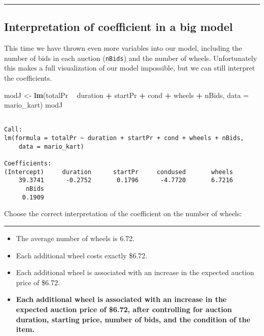 \documentclass[]{book}
\newenvironment{Shaded}{\begin{snugshade}}{\end{snugshade}}
\newcommand{\KeywordTok}[1]{\textcolor[rgb]{0.13,0.29,0.53}{\textbf{#1}}}
\newcommand{\DataTypeTok}[1]{\textcolor[rgb]{0.13,0.29,0.53}{#1}}
\newcommand{\StringTok}[1]{\textcolor[rgb]{0.31,0.60,0.02}{#1}}
\newcommand{\OperatorTok}[1]{\textcolor[rgb]{0.81,0.36,0.00}{\textbf{#1}}}
\newcommand{\NormalTok}[1]{#1}
\begin{document}
\begin{center}\rule{0.5\linewidth}{\linethickness}\end{center}

\subsection*{Interpretation of coefficient in a big
model}\label{interpretation-of-coefficient-in-a-big-model}

This time we have thrown even more variables into our model, including
the number of bids in each auction (\texttt{nBids}) and the number of
wheels. Unfortunately this makes a full visualization of our model
impossible, but we can still interpret the coefficients.

\begin{Shaded}
\begin{Highlighting}[]
\NormalTok{modJ <-}\StringTok{ }\KeywordTok{lm}\NormalTok{(totalPr }\OperatorTok{~}\StringTok{ }\NormalTok{duration }\OperatorTok{+}\StringTok{ }\NormalTok{startPr }\OperatorTok{+}\StringTok{ }\NormalTok{cond }\OperatorTok{+}\StringTok{ }\NormalTok{wheels }\OperatorTok{+}\StringTok{ }\NormalTok{nBids, }
    \DataTypeTok{data =}\NormalTok{ mario_kart)}
\NormalTok{modJ}
\end{Highlighting}
\end{Shaded}

\begin{verbatim}

Call:
lm(formula = totalPr ~ duration + startPr + cond + wheels + nBids, 
    data = mario_kart)

Coefficients:
(Intercept)     duration      startPr     condused       wheels  
    39.3741      -0.2752       0.1796      -4.7720       6.7216  
      nBids  
     0.1909  
\end{verbatim}

Choose the correct interpretation of the coefficient on the number of
wheels:

\begin{center}\rule{0.5\linewidth}{\linethickness}\end{center}

\begin{itemize}
\item
  The average number of wheels is 6.72.
\item
  Each additional wheel costs exactly \$6.72.
\item
  Each additional wheel is associated with an increase in the expected
  auction price of \$6.72.
\item
  \textbf{Each additional wheel is associated with an increase in the
  expected auction price of \$6.72, after controlling for auction
  duration, starting price, number of bids, and the condition of the
  item.}
\end{itemize}
\end{document}
